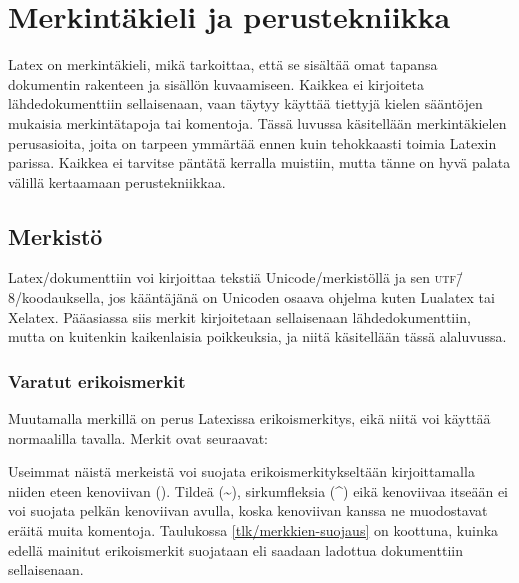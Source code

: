 
\chapter{Merkintäkieli ja perustekniikka}

Latex on merkintäkieli, mikä tarkoittaa, että se sisältää omat tapansa
dokumentin rakenteen ja sisällön kuvaamiseen. Kaikkea ei kirjoiteta
lähdedokumenttiin sellaisenaan, vaan täytyy käyttää tiettyjä kielen
sääntöjen mukaisia merkintätapoja tai komentoja. Tässä luvussa
käsitellään merkintäkielen perusasioita, joita on tarpeen ymmärtää ennen
kuin tehokkaasti toimia Latexin parissa. Kaikkea ei tarvitse päntätä
kerralla muistiin, mutta tänne on hyvä palata välillä kertaamaan
perustekniikkaa.

\section{Merkistö}

Latex\-/dokumenttiin voi kirjoittaa tekstiä Unicode\-/merkistöllä ja sen
\textsc{utf}\=/8\-/koodauksella, jos kääntäjänä on Unicoden osaava
ohjelma kuten Lualatex tai Xelatex. Pääasiassa siis merkit kirjoitetaan
sellaisenaan lähdedokumenttiin, mutta on kuitenkin kaikenlaisia
poikkeuksia, ja niitä käsitellään tässä alaluvussa.

\subsection{Varatut erikoismerkit}

Muutamalla merkillä on perus Latexissa erikoismerkitys, eikä niitä voi
käyttää normaalilla tavalla. Merkit ovat seuraavat:

\begin{koodilohkosis}
\end{koodilohkosis}

\noindent
Useimmat näistä merkeistä voi suojata erikoismerkitykseltään
kirjoittamalla niiden eteen kenoviivan (\koodi{\keno}). Tildeä
(\textasciitilde), sirkumfleksia (\textasciicircum) eikä kenoviivaa
itseään ei voi suojata pelkän kenoviivan avulla, koska kenoviivan kanssa
ne muodostavat eräitä muita komentoja. Taulukossa
\ref{tlk/merkkien-suojaus} on koottuna, kuinka edellä mainitut
erikoismerkit suojataan eli saadaan ladottua dokumenttiin sellaisenaan.

